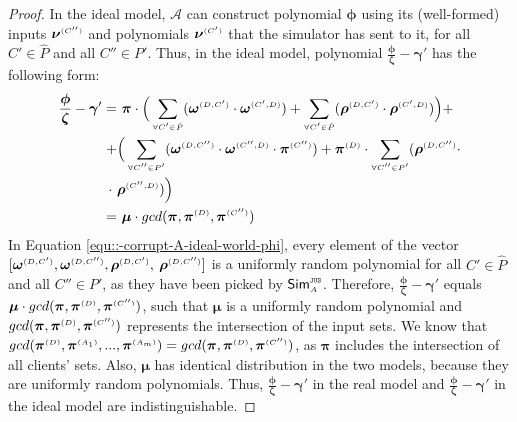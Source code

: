 \begin{proof}
In the ideal model, $\mathcal{A}$ can construct polynomial $ {\bm\phi}$ using its (well-formed) inputs $ {\bm\nu}^{ \scriptscriptstyle {  {(C'')}} }$ and polynomials $ {\bm\nu}^{ \scriptscriptstyle {  {(C')}} }$ that the simulator has sent to it, for all $C'\in\hat P$ and all $C''\in P'$. Thus, in the ideal model, polynomial $\frac{ {\bm\phi}}{\bm\zeta}-  {\bm\gamma'}$ has the following form:
%
\begin{equation}\label{equ::-corrupt-A-ideal-world-phi}
\begin{split}
%
\frac{ {\bm\phi}}{\bm\zeta}-  {\bm\gamma'}  = &\  { \bm\pi}\cdot\Big(\sum\limits_{\st \forall C'\in \hat P}(\bm\omega^{ \st {  {(D, C')}}} \cdot \bm\omega^{ \st {  {(C', D)}}}) + \sum\limits_{\st \forall C'\in \hat P}(\bm\rho^{ \st {  {(D, C')}}} \cdot \bm\rho^{ \st {  {(C', D)}}})\Big)+\\+ & \Big(\sum\limits_{\st \forall C''\in P'}(\bm\omega^{ \st {  {(D,C'')}}} \cdot \bm\omega^{ \st {  {(C'',D)}}}\cdot \bm\pi^{ \st {  (C'')}}) +\bm\pi^{ \st {  {(D)}}}\cdot\sum\limits_{\st \forall C''\in P'} (\bm\rho^{ \st {  {(D, C'')}}}\cdot \\ \cdot \ & \bm\rho^{ \st {  {(C'',D)}}})\Big) \\  =  &\ {\bm\mu}\cdot gcd(  {\bm\pi}, \bm\pi^{ \st {  {(D)}}}, \bm\pi^{ \st {  {(C'')}}})
 \end{split}
\end{equation}
In Equation \ref{equ::-corrupt-A-ideal-world-phi}, every element of the vector $[\bm\omega^{ \scriptscriptstyle {  {(D,C')}}}, \bm\omega^{ \scriptscriptstyle {  {(D,C'')}}}, \bm\rho^{ \scriptscriptstyle {  {(D,C')}}}, $ $\bm\rho^{ \scriptscriptstyle {  {(D,C'')}}}]$ is a uniformly random polynomial for all $C'\in\hat P$ and all $C''\in P'$, as they have been picked by $\mathsf{Sim}^{\scriptscriptstyle \mathtt{JUS}}_{\scriptscriptstyle A}$. Therefore, $\frac{ {\bm\phi}}{\bm\zeta}-  {\bm\gamma'}$ equals $ {\bm\mu}\cdot gcd(  {\bm\pi}, \bm\pi^{ \scriptscriptstyle {  {(D)}}}, \bm\pi^{ \scriptscriptstyle {  {(C'')}}})$, such that $ {\bm\mu}$ is a uniformly random polynomial and $gcd(  {\bm\pi}, \bm\pi^{ \scriptscriptstyle {  {(D)}}}, \bm\pi^{ \scriptscriptstyle {  {(C'')}}})$ represents the intersection of the input sets. We know that $gcd( \bm\pi^{ \scriptscriptstyle {  {(D)}} },\bm\pi^{\scriptscriptstyle (A_1)}, ..., \bm\pi^{\scriptscriptstyle (A_m)})=gcd(  {\bm\pi}, \bm\pi^{ \scriptscriptstyle {  {(D)}}}, \bm\pi^{ \scriptscriptstyle {  {(C'')}}})$, as $ {\bm\pi}$ includes the intersection of all clients' sets. Also, $ {\bm\mu}$ has identical distribution in the two models, because they are uniformly random polynomials. Thus,  $\frac{\bm\phi}{\bm\zeta}- \bm\gamma'$ in the real model and $\frac{ {\bm\phi}} { {\bm\zeta}}-  {\bm\gamma'}$ in the ideal model are indistinguishable.



\end{proof}
